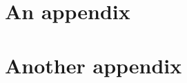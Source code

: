 \documentclass[english, 11pt]{article}\usepackage[]{graphicx}\usepackage[]{color}
\begin{document}
\appendix
\section{An appendix}

\lipsum[10-11]

%
%

















\section{Another appendix}

\lipsum[12-13]

%
%

















\end{document}

